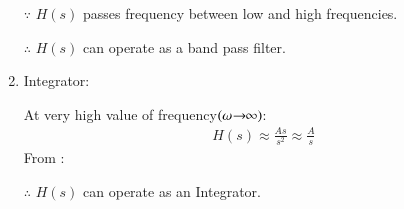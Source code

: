 \documentclass[journal,12pt,twocolumn]{IEEEtran}
\theoremstyle{remark}
\begin{document}
\begin{enumerate}[label={\alph*)}]
\begin{tikzpicture}
\end{tikzpicture}
$\because$ $H(s)$ passes frequency between low and high frequencies.

$\therefore$ $H(s)$ can operate as a band pass filter.
\item Integrator:

At very high value of frequency$(\omega\mkern-4mu \rightarrow\mkern-6mu\infty)$:
\begin{align}
    H(s) \approx \frac{As}{s^2} \approx \frac{A}{s}\label{eq:integrator.EE.11.2022}
\end{align}
From :

$\therefore$ $H(s)$ can operate as an Integrator.
\end{enumerate}


% 
\end{document}
